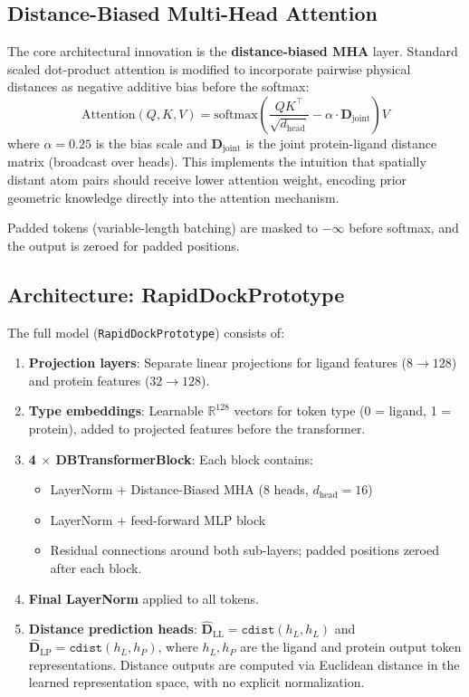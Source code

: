 \documentclass[a4paper,11pt,twoside]{report}
\begin{document}
\subsection{Distance-Biased Multi-Head Attention}

The core architectural innovation is the \textbf{distance-biased MHA} layer. Standard scaled dot-product attention is modified to incorporate pairwise physical distances as negative additive bias before the softmax:
\begin{equation}
  \text{Attention}(Q,K,V) = \text{softmax}\!\left(\frac{QK^\top}{\sqrt{d_\text{head}}} - \alpha \cdot \mathbf{D}_\text{joint}\right)V
  \label{eq:dist_bias_attn}
\end{equation}
where $\alpha = 0.25$ is the bias scale and $\mathbf{D}_\text{joint}$ is the joint protein-ligand distance matrix (broadcast over heads). This implements the intuition that spatially distant atom pairs should receive lower attention weight, encoding prior geometric knowledge directly into the attention mechanism.

Padded tokens (variable-length batching) are masked to $-\infty$ before softmax, and the output is zeroed for padded positions.

\subsection{Architecture: RapidDockPrototype}

The full model (\texttt{RapidDockPrototype}) consists of:
\begin{enumerate}
  \item \textbf{Projection layers}: Separate linear projections for ligand features ($8 \to 128$) and protein features ($32 \to 128$).
  \item \textbf{Type embeddings}: Learnable $\mathbb{R}^{128}$ vectors for token type (0 = ligand, 1 = protein), added to projected features before the transformer.
  \item \textbf{4 $\times$ DBTransformerBlock}: Each block contains:
    \begin{itemize}
      \item LayerNorm + Distance-Biased MHA (8 heads, $d_\text{head} = 16$)
      \item LayerNorm + feed-forward MLP block
      \item Residual connections around both sub-layers; padded positions zeroed after each block.
    \end{itemize}
  \item \textbf{Final LayerNorm} applied to all tokens.
  \item \textbf{Distance prediction heads}: $\mathbf{\hat{D}}_\text{LL} = \texttt{cdist}(h_L, h_L)$ and $\mathbf{\hat{D}}_\text{LP} = \texttt{cdist}(h_L, h_P)$, where $h_L, h_P$ are the ligand and protein output token representations. Distance outputs are computed via Euclidean distance in the learned representation space, with no explicit normalization.
\end{enumerate}
\end{document}
